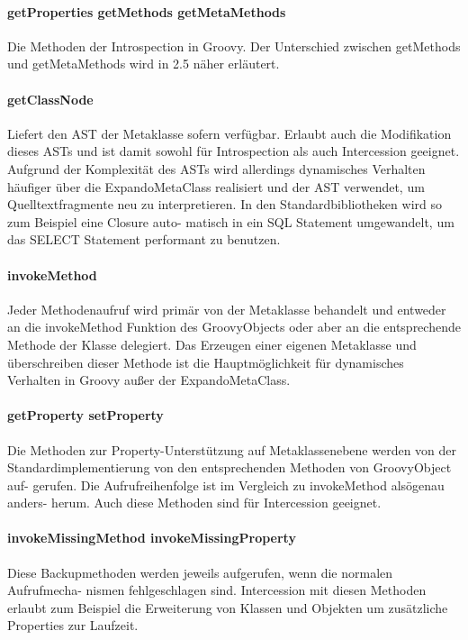\documentclass[11pt,english,ngerman, headsepline]{scrreprt}
\begin{document}
 
\paragraph{ getProperties getMethods getMetaMethods}
Die Methoden der Introspection in Groovy. Der Unterschied zwischen getMethods
und getMetaMethods wird in 2.5 näher erläutert.
\paragraph{ getClassNode}
Liefert den AST der Metaklasse sofern verfügbar. Erlaubt auch die Modifikation
dieses ASTs und ist damit sowohl für Introspection als auch Intercession
geeignet. Aufgrund der Komplexität des ASTs wird allerdings dynamisches
Verhalten häufiger über die ExpandoMetaClass realisiert und der AST verwendet,
um Quelltextfragmente neu zu interpretieren. In den Standardbibliotheken wird so
zum Beispiel eine Closure auto- matisch in ein SQL Statement umgewandelt, um das
SELECT Statement performant zu benutzen.
\paragraph{ invokeMethod}
Jeder Methodenaufruf wird primär von der Metaklasse behandelt und entweder an
die invokeMethod Funktion des GroovyObjects oder aber an die entsprechende
Methode der Klasse delegiert. Das Erzeugen einer eigenen Metaklasse und
überschreiben dieser Methode ist die Hauptmöglichkeit für dynamisches
Verhalten in Groovy außer der ExpandoMetaClass.
\paragraph{ getProperty setProperty}
Die Methoden zur Property-Unterstützung auf Metaklassenebene werden von der
Standardimplementierung von den entsprechenden Methoden von GroovyObject auf-
gerufen. Die Aufrufreihenfolge ist im Vergleich zu invokeMethod alsögenau
anders- herum. Auch diese Methoden sind für Intercession geeignet.
\paragraph{ invokeMissingMethod invokeMissingProperty}
Diese Backupmethoden werden jeweils aufgerufen, wenn die normalen Aufrufmecha-
nismen fehlgeschlagen sind. Intercession mit diesen Methoden erlaubt zum
Beispiel die Erweiterung von Klassen und Objekten um zusätzliche Properties zur
Laufzeit.
 \cite{mpInGroovy}
\end{document}
